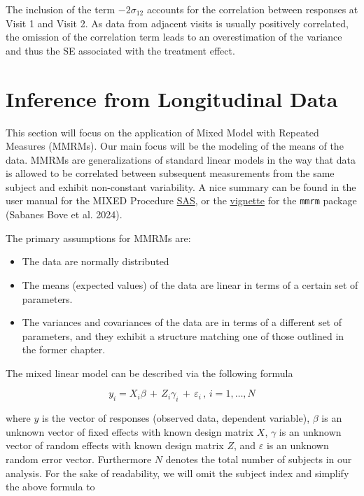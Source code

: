 \documentclass[
  letterpaper,
  DIV=11,
  numbers=noendperiod]{scrreprt}
\begin{document}
The inclusion of the term \(- 2\sigma_{12}\) accounts for the
correlation between responses at Visit 1 and Visit 2. As data from
adjacent visits is usually positively correlated, the omission of the
correlation term leads to an overestimation of the variance and thus the
SE associated with the treatment effect.


\hypertarget{inference-from-longitudinal-data}{%
\chapter{Inference from Longitudinal
Data}\label{inference-from-longitudinal-data}}

This section will focus on the application of Mixed Model with Repeated
Measures (MMRMs). Our main focus will be the modeling of the means of
the data. MMRMs are generalizations of standard linear models in the way
that data is allowed to be correlated between subsequent measurements
from the same subject and exhibit non-constant variability. A nice
summary can be found in the user manual for the MIXED Procedure
\href{https://support.sas.com/documentation/cdl/en/statug/63033/HTML/default/viewer.htm\#mixed_toc.htm}{SAS},
or the
\href{https://openpharma.github.io/mmrm/latest-tag/articles/methodological_introduction.html}{vignette}
for the \texttt{mmrm} package (Sabanes Bove et al. 2024).

The primary assumptions for MMRMs are:

\begin{itemize}
\item
  The data are normally distributed
\item
  The means (expected values) of the data are linear in terms of a
  certain set of parameters.
\item
  The variances and covariances of the data are in terms of a different
  set of parameters, and they exhibit a structure matching one of those
  outlined in the former chapter.
\end{itemize}

The mixed linear model can be described via the following formula

\[
y_i = X_i\beta\,+\,Z_i\gamma_i\,+\,\varepsilon_i\,,\, i = 1,\ldots,N
\]

where \(y\) is the vector of responses (observed data, dependent
variable), \(\beta\) is an unknown vector of fixed effects with known
design matrix \(X\), \(\gamma\) is an unknown vector of random effects
with known design matrix \(Z\), and \(\varepsilon\) is an unknown random
error vector. Furthermore \(N\) denotes the total number of subjects in
our analysis. For the sake of readability, we will omit the subject
index and simplify the above formula to
\end{document}

